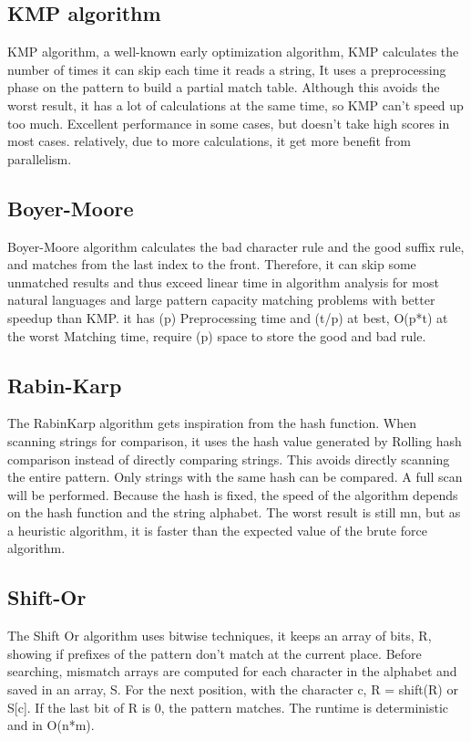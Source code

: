 \documentclass[11pt]{article}       %
\begin{document}
\subsection{KMP algorithm}\label{kmp}
KMP algorithm, a well-known early optimization algorithm, KMP calculates the number of times it can skip each time it reads a string, It uses a preprocessing phase on the pattern to build a partial match table. Although this avoids the worst result, it has a lot of calculations at the same time, so KMP can’t speed up too much. Excellent performance in some cases, but doesn’t take high scores in most cases. relatively, due to more calculations, it get more benefit from parallelism.

\subsection{Boyer-Moore}\label{bm}
Boyer-Moore algorithm calculates the bad character rule and the good suffix rule, and matches from the last index to the front. Therefore, it can skip some unmatched results and thus exceed linear time in algorithm analysis for most natural languages and large pattern capacity matching problems with better speedup than KMP. it has (p) Preprocessing time and  (t/p) at best, O(p*t) at the worst Matching time, require (p) space to store the good and bad rule.

\subsection{Rabin-Karp}\label{bm}
The RabinKarp algorithm gets inspiration from the hash function. When scanning strings for comparison, it uses the hash value generated by Rolling hash comparison instead of directly comparing strings. This avoids directly scanning the entire pattern. Only strings with the same hash can be compared. A full scan will be performed. Because the hash is fixed, the speed of the algorithm depends on the hash function and the string alphabet. The worst result is still mn, but as a heuristic algorithm, it is faster than the expected value of the brute force algorithm.

\subsection{Shift-Or}\label{so}
The Shift Or algorithm uses bitwise techniques\cite{Matching}, it keeps an array of bits, R, showing if prefixes of the pattern don't match at the current place. Before searching, mismatch arrays are computed for each character in the alphabet and saved in an array, S. For the next position, with the character c, R = shift(R) or S[c]. If the last bit of R is 0, the pattern matches. The runtime is deterministic and in O(n*m).
\end{document}
